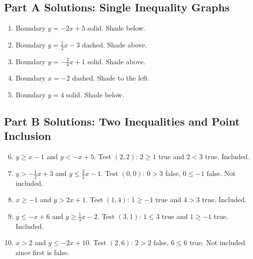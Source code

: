 \documentclass[14pt]{extarticle}
\begin{document}
\subsection*{Part A Solutions: Single Inequality Graphs}
\begin{enumerate}
  \item Boundary \(y=-2x+5\) solid. Shade below.
  \item Boundary \(y=\tfrac12 x-3\) dashed. Shade above.
  \item Boundary \(y=-\tfrac34 x+1\) solid. Shade above.
  \item Boundary \(x=-2\) dashed. Shade to the left.
  \item Boundary \(y=4\) solid. Shade below.
\end{enumerate}

\subsection*{Part B Solutions: Two Inequalities and Point Inclusion}
\begin{enumerate}
  \setcounter{enumi}{5}
  \item \(y\ge x-1\) and \(y<-x+5\). Test \((2,2)\): \(2\ge1\) true and \(2<3\) true. Included.
  \item \(y>-\tfrac12x+3\) and \(y\le \tfrac32x-1\). Test \((0,0)\): \(0>3\) false, \(0\le-1\) false. Not included.
  \item \(x\ge -1\) and \(y>2x+1\). Test \((1,4)\): \(1\ge-1\) true and \(4>3\) true. Included.
  \item \(y\le -x+6\) and \(y\ge \tfrac13 x-2\). Test \((3,1)\): \(1\le3\) true and \(1\ge -1\) true. Included.
  \item \(x>2\) and \(y\le -2x+10\). Test \((2,6)\): \(2>2\) false, \(6\le6\) true. Not included since first is false.
\end{enumerate}
\end{document}
